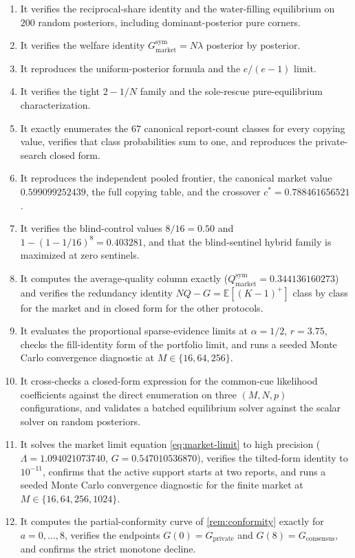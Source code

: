 \documentclass[11pt]{article}
\theoremstyle{definition}
\theoremstyle{remark}
\newcommand{\E}{\mathbb{E}}
\newcommand{\1}{\mathbf{1}}
\newcommand{\priv}{\mathrm{private}}
\newcommand{\cons}{\mathrm{consensus}}
\newcommand{\mkt}{\mathrm{market}}
\begin{document}
\begin{enumerate}
\item It verifies the reciprocal-share identity and the water-filling equilibrium on $200$ random posteriors, including dominant-posterior pure corners.
\item It verifies the welfare identity $G_{\mkt}^{\mathrm{sym}}=N\lambda$ posterior by posterior.
\item It reproduces the uniform-posterior formula and the $e/(e-1)$ limit.
\item It verifies the tight $2-1/N$ family and the sole-rescue pure-equilibrium characterization.
\item It exactly enumerates the $67$ canonical report-count classes for every copying value, verifies that class probabilities sum to one, and reproduces the private-search closed form.
\item It reproduces the independent pooled frontier, the canonical market value $0.599099252439$, the full copying table, and the crossover $c^*=0.788461656521$.
\item It verifies the blind-control values $8/16=0.50$ and $1-(1-1/16)^8=0.403281$, and that the blind-sentinel hybrid family is maximized at zero sentinels.
\item It computes the average-quality column exactly ($Q_{\mkt}^{\mathrm{sym}}=0.344136160273$) and verifies the redundancy identity $NQ-G=\E[(K-1)^{+}]$ class by class for the market and in closed form for the other protocols.
\item It evaluates the proportional sparse-evidence limits at $\alpha=1/2$, $r=3.75$, checks the fill-identity form of the portfolio limit, and runs a seeded Monte Carlo convergence diagnostic at $M\in\{16,64,256\}$.
\item It cross-checks a closed-form expression for the common-cue likelihood coefficients against the direct enumeration on three $(M,N,p)$ configurations, and validates a batched equilibrium solver against the scalar solver on random posteriors.
\item It solves the market limit equation \cref{eq:market-limit} to high precision ($\Lambda=1.094021073740$, $G=0.547010536870$), verifies the tilted-form identity to $10^{-11}$, confirms that the active support starts at two reports, and runs a seeded Monte Carlo convergence diagnostic for the finite market at $M\in\{16,64,256,1024\}$.
\item It computes the partial-conformity curve of \cref{rem:conformity} exactly for $a=0,\ldots,8$, verifies the endpoints $G(0)=G_{\priv}$ and $G(8)=G_{\cons}$, and confirms the strict monotone decline.

\end{enumerate}
\end{document}
